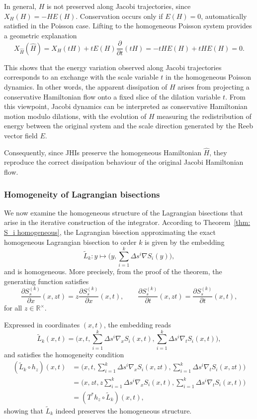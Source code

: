 \documentclass[12pt,english]{article}
\begin{document}
In general, $H$ is not preserved along Jacobi trajectories, since $X_H(H)=-H E(H)$. Conservation occurs only if $E(H)=0$, automatically satisfied in the Poisson case. Lifting to the homogeneous Poisson system provides a geometric explanation
\[
X_{\hat H}(\hat H) = X_H(tH) + tE(H)\frac{\partial}{\partial t}(tH) = -tH E(H) + tH E(H) = 0.
\]

This shows that the energy variation observed along Jacobi trajectories corresponds to an exchange with the scale variable $t$ in the homogeneous Poisson dynamics. In other words, the apparent dissipation of $H$ arises from projecting a conservative Hamiltonian flow onto a fixed slice of the dilation variable $t$. From this viewpoint, Jacobi dynamics can be interpreted as conservative Hamiltonian motion modulo dilations, with the evolution of $H$ measuring the redistribution of energy between the original system and the scale direction generated by the Reeb vector field $E$.

Consequently, since JHIs preserve the homogeneous Hamiltonian $\hat H$, they reproduce the correct dissipation behaviour of the original Jacobi Hamiltonian flow.

\subsubsection{Homogeneity of Lagrangian bisections}

We now examine the homogeneous structure of the Lagrangian bisections that arise in the iterative construction of the integrator. According to Theorem~\ref{thm: S_i homogeneous}, the Lagrangian bisection approximating the exact homogeneous Lagrangian bisection to order $k$ is given by the embedding
\[
\tilde{L}_k : y \mapsto \Big(y, \sum_{i=1}^k \Delta s^i \nabla S_i(y) \Big),
\]
and is homogeneous. More precisely, from the proof of the theorem, the generating function satisfies
\[
\frac{\partial S_s^{(k)}}{\partial x}(x, zt) = z \frac{\partial S_s^{(k)}}{\partial x}(x,t), \qquad 
\frac{\partial S_s^{(k)}}{\partial t}(x, zt) = \frac{\partial S_s^{(k)}}{\partial t}(x,t),
\]
for all $z \in \mathbb{R}^\times$.

Expressed in coordinates $(x,t)$, the embedding reads
\[
\tilde{L}_k(x,t) = \Big(x, t, \sum_{i=1}^k \Delta s^i \nabla_x S_i(x,t), \sum_{i=1}^k \Delta s^i \nabla_t S_i(x,t) \Big),
\]
and satisfies the homogeneity condition
\begin{align*}
(\tilde{L}_k \circ h_z)(x,t) 
&= \Big(x, t, \sum_{i=1}^k \Delta s^i \nabla_x S_i(x, zt), \sum_{i=1}^k \Delta s^i \nabla_t S_i(x, zt) \Big)\\
&= \Big(x, zt, z \sum_{i=1}^k \Delta s^i \nabla_x S_i(x,t), \sum_{i=1}^k \Delta s^i \nabla_t S_i(x,t) \Big)\\
&= (T^* h_z \circ \tilde{L}_k)(x,t),
\end{align*}
showing that $\tilde{L}_k$ indeed preserves the homogeneous structure.
\end{document}
